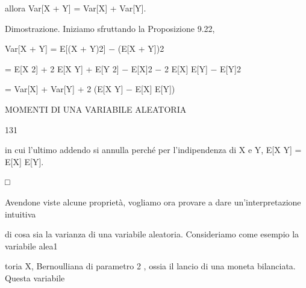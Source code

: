 \documentclass[a4paper,portrait,12pt]{article}
\begin{document}
\begin{flushleft}
allora Var[X + Y] = Var[X] + Var[Y].
\end{flushleft}


\begin{flushleft}
Dimostrazione. Iniziamo sfruttando la Proposizione 9.22,
\end{flushleft}


\begin{flushleft}
Var[X + Y] = E[(X + Y)2] $-$ (E[X + Y])2
\end{flushleft}


\begin{flushleft}
= E[X 2] + 2 E[X Y] + E[Y 2] $-$ E[X]2 $-$ 2 E[X] E[Y] $-$ E[Y]2
\end{flushleft}


\begin{flushleft}
= Var[X] + Var[Y] + 2 (E[X Y] $-$ E[X] E[Y])
\end{flushleft}





\begin{flushleft}
 MOMENTI DI UNA VARIABILE ALEATORIA
\end{flushleft}





131





\begin{flushleft}
in cui l'ultimo addendo si annulla perch\'{e} per l'indipendenza di X e Y, E[X Y] = E[X] E[Y].
\end{flushleft}





□





\begin{flushleft}
Avendone viste alcune propriet\`{a}, vogliamo ora provare a dare un'interpretazione intuitiva
\end{flushleft}


\begin{flushleft}
di cosa sia la varianza di una variabile aleatoria. Consideriamo come esempio la variabile alea1
\end{flushleft}


\begin{flushleft}
toria X, Bernoulliana di parametro 2 , ossia il lancio di una moneta bilanciata. Questa variabile
\end{flushleft}
\end{document}
